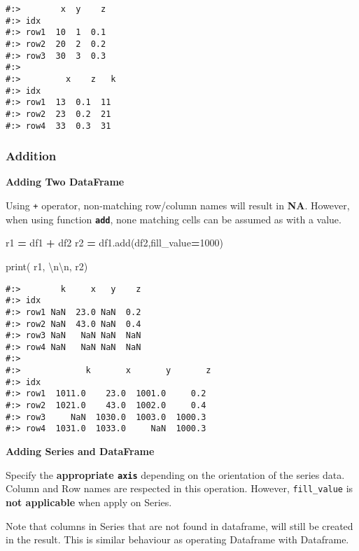 \documentclass[
]{book}
\newenvironment{Shaded}{\begin{snugshade}}{\end{snugshade}}
\newcommand{\BuiltInTok}[1]{#1}
\newcommand{\CharTok}[1]{\textcolor[rgb]{0.5,0.5,0.5}{#1}}
\newcommand{\DecValTok}[1]{\textcolor[rgb]{0.06,0.06,0.06}{#1}}
\newcommand{\NormalTok}[1]{#1}
\newcommand{\OperatorTok}[1]{\textcolor[rgb]{0.43,0.43,0.43}{\textbf{#1}}}
\newcommand{\StringTok}[1]{\textcolor[rgb]{0.5,0.5,0.5}{#1}}
\begin{document}
\begin{verbatim}
#:>        x  y    z
#:> idx             
#:> row1  10  1  0.1
#:> row2  20  2  0.2
#:> row3  30  3  0.3 
#:> 
#:>         x    z   k
#:> idx              
#:> row1  13  0.1  11
#:> row2  23  0.2  21
#:> row4  33  0.3  31
\end{verbatim}

\hypertarget{addition}{%
\subsubsection{Addition}\label{addition}}

\textbf{Adding Two DataFrame}

Using \texttt{+} operator, non-matching row/column names will result in \textbf{NA}. However, when using function \textbf{\texttt{add}}, none matching cells can be assumed as with a value.

\begin{Shaded}
\begin{Highlighting}[]
\NormalTok{r1 }\OperatorTok{=}\NormalTok{ df1 }\OperatorTok{+}\NormalTok{ df2}
\NormalTok{r2 }\OperatorTok{=}\NormalTok{ df1.add(df2,fill\_value}\OperatorTok{=}\DecValTok{1000}\NormalTok{)}

\BuiltInTok{print}\NormalTok{( r1, }\StringTok{\textquotesingle{}}\CharTok{\textbackslash{}n\textbackslash{}n}\StringTok{\textquotesingle{}}\NormalTok{, r2)}
\end{Highlighting}
\end{Shaded}

\begin{verbatim}
#:>        k     x   y    z
#:> idx                    
#:> row1 NaN  23.0 NaN  0.2
#:> row2 NaN  43.0 NaN  0.4
#:> row3 NaN   NaN NaN  NaN
#:> row4 NaN   NaN NaN  NaN 
#:> 
#:>             k       x       y       z
#:> idx                                 
#:> row1  1011.0    23.0  1001.0     0.2
#:> row2  1021.0    43.0  1002.0     0.4
#:> row3     NaN  1030.0  1003.0  1000.3
#:> row4  1031.0  1033.0     NaN  1000.3
\end{verbatim}

\textbf{Adding Series and DataFrame}

Specify the \textbf{appropriate \texttt{axis}} depending on the orientation of the series data. Column and Row names are respected in this operation. However, \texttt{fill\_value} is \textbf{not applicable} when apply on Series.

Note that columns in Series that are not found in dataframe, will still be created in the result. This is similar behaviour as operating Dataframe with Dataframe.
\end{document}
